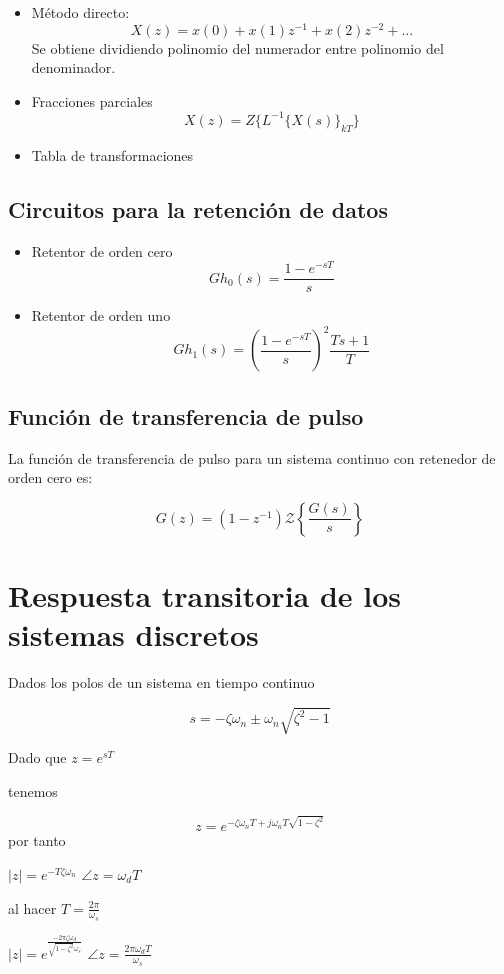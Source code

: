 \documentclass[legalpaper,twocolumn]{article}
\begin{document}
\begin{itemize}
    \item Método directo:
          \[X(z) =x(0) + x(1)z^{-1} + x(2)z^{-2} + ...\]
          Se obtiene dividiendo polinomio del numerador entre polinomio del denominador.
    \item Fracciones parciales
          \[X(z) = Z \{L^{-1}\{X(s)\}_{kT}\}\]
    \item Tabla de transformaciones
\end{itemize}

\subsection*{Circuitos para la retención de datos}

\begin{itemize}
    \item Retentor de orden cero
          \[Gh_0(s) = \frac{1- e^{-sT}}{s}\]
    \item Retentor de orden uno
          \[Gh_1(s) = \left(\frac{1- e^{-sT}}{s}\right)^2 \frac{Ts +1 }{T}\]
\end{itemize}
\subsection*{Función de transferencia de pulso}

La función de transferencia de pulso para un sistema continuo con retenedor de orden cero es:

\[ G(z) = (1 - z^{-1}) \mathcal{Z} \left\{ \frac{G(s)}{s} \right\} \]

\section*{Respuesta transitoria de los sistemas discretos}
Dados los polos de un sistema en tiempo continuo

\[ s = -\zeta \omega_n \pm \omega_n \sqrt{\zeta^2 - 1} \]

Dado que \(z=e^{sT}\)

tenemos

\[z=e^{-\zeta\omega_nT+j\omega_nT\sqrt{1-\zeta^2}}\]
por tanto

\begin{center}
    \(|z| = e^{-T\zeta\omega_n}\) \hfil \(\angle{z}= \omega_dT\)
\end{center}

al hacer \(T=\frac{2\pi}{\omega_s}\)

\begin{center}
    \(|z| = e^{\frac{-2\pi\zeta\omega_d }{\sqrt{1-\zeta^2}\omega_s }}\) \hfil \(\angle{z}= \frac{2\pi\omega_dT}{\omega_s}\)
\end{center}
\end{document}
